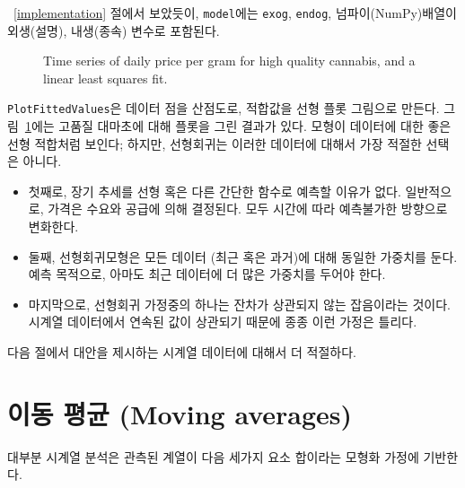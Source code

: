 ~\ref{implementation} 절에서 보았듯이, {\tt model}에는 {\tt exog}, {\tt endog}, 넘파이(NumPy)배열이 외생(설명), 내생(종속) 변수로 포함된다.

\begin{figure}
\caption{Time series of daily price per gram for high quality cannabis,
and a linear least squares fit.}
\label{timeseries2}
\end{figure}

{\tt PlotFittedValues}은 데이터 점을 산점도로, 적합값을 선형 플롯 그림으로 만든다. 그림~\ref{timeseries2}에는 고품질 대마초에 대해 플롯을 그린 결과가 있다. 모형이 데이터에 대한 좋은 선형 적합처럼 보인다; 하지만, 선형회귀는 이러한 데이터에 대해서 가장 적절한 선택은 아니다.

\begin{itemize}

\item 첫째로, 장기 추세를 선형 혹은 다른 간단한 함수로 예측할 이유가 없다.
일반적으로, 가격은 수요와 공급에 의해 결정된다. 모두 시간에 따라 예측불가한 방향으로 변화한다.

\item 둘째, 선형회귀모형은 모든 데이터 (최근 혹은 과거)에 대해 동일한 가중치를 둔다. 예측 목적으로, 아마도 최근 데이터에 더 많은 가중치를 두어야 한다.

\item 마지막으로, 선형회귀 가정중의 하나는 잔차가 상관되지 않는 잡음이라는 것이다. 시계열 데이터에서 연속된 값이 상관되기 때문에 종종 이런 가정은 틀리다. 

\end{itemize}

다음 절에서 대안을 제시하는 시계열 데이터에 대해서 더 적절하다.

\section{이동 평균 (Moving averages)}

대부분 시계열 분석은 관측된 계열이 다음 세가지 요소 합이라는 모형화 가정에 기반한다.


